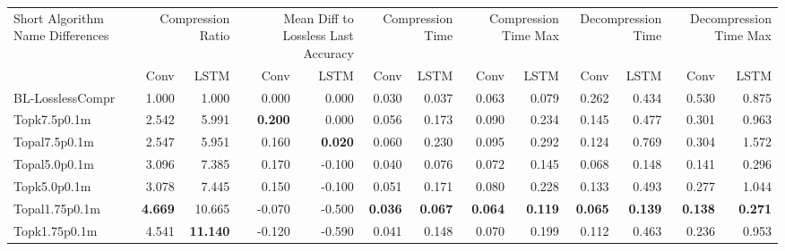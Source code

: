 \begin{tabular}{lrrrrrrrrrrrr}
\toprule
\multicolumn{1}{p{2.5cm}}{Short Algorithm Name Differences} & \multicolumn{2}{p{1.8cm}}{Compression Ratio} & \multicolumn{2}{p{1.8cm}}{Mean Diff to Lossless Last Accuracy} & \multicolumn{2}{p{1.8cm}}{Compression Time} & \multicolumn{2}{p{1.8cm}}{Compression Time Max} & \multicolumn{2}{p{1.8cm}}{Decompression Time} & \multicolumn{2}{p{1.8cm}}{Decompression Time Max} \\
 & Conv & LSTM & Conv & LSTM & Conv & LSTM & Conv & LSTM & Conv & LSTM & Conv & LSTM \\
\midrule
BL-LosslessCompr & 1.000 & 1.000 & 0.000 & 0.000 & 0.030 & 0.037 & 0.063 & 0.079 & 0.262 & 0.434 & 0.530 & 0.875 \\
Topk7.5p0.1m & 2.542 & 5.991 & \bfseries 0.200 & 0.000 & 0.056 & 0.173 & 0.090 & 0.234 & 0.145 & 0.477 & 0.301 & 0.963 \\
Topal7.5p0.1m & 2.547 & 5.951 & 0.160 & \bfseries 0.020 & 0.060 & 0.230 & 0.095 & 0.292 & 0.124 & 0.769 & 0.304 & 1.572 \\
Topal5.0p0.1m & 3.096 & 7.385 & 0.170 & -0.100 & 0.040 & 0.076 & 0.072 & 0.145 & 0.068 & 0.148 & 0.141 & 0.296 \\
Topk5.0p0.1m & 3.078 & 7.445 & 0.150 & -0.100 & 0.051 & 0.171 & 0.080 & 0.228 & 0.133 & 0.493 & 0.277 & 1.044 \\
Topal1.75p0.1m & \bfseries 4.669 & 10.665 & -0.070 & -0.500 & \bfseries 0.036 & \bfseries 0.067 & \bfseries 0.064 & \bfseries 0.119 & \bfseries 0.065 & \bfseries 0.139 & \bfseries 0.138 & \bfseries 0.271 \\
Topk1.75p0.1m & 4.541 & \bfseries 11.140 & -0.120 & -0.590 & 0.041 & 0.148 & 0.070 & 0.199 & 0.112 & 0.463 & 0.236 & 0.953 \\
\bottomrule
\end{tabular}
